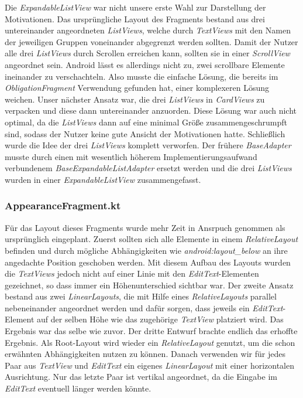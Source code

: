 Die \textit{ExpandableListView} war nicht unsere erste Wahl zur Darstellung der Motivationen. Das ursprüngliche Layout des Fragments bestand aus drei untereinander angeordneten \textit{ListViews}, welche
durch \textit{TextViews} mit den Namen der jeweiligen Gruppen voneinander abgegrenzt werden sollten. Damit der Nutzer alle drei \textit{ListViews} durch Scrollen erreichen kann, sollten sie in einer \textit{ScrollView} angeordnet sein. Android lässt es allerdings nicht zu, zwei scrollbare Elemente ineinander zu verschachteln. Also musste die einfache Lösung, die bereits im \textit{ObligationFragment} Verwendung gefunden hat, einer komplexeren Lösung weichen. Unser nächster Ansatz war, die drei \textit{ListViews} in \textit{CardViews} zu verpacken und diese dann untereinander anzuorden. Diese Lösung war auch nicht optimal, da die \textit{ListViews} dann auf eine minimal Größe zusammengeschrumpft sind, sodass der Nutzer keine gute Ansicht der Motivationen hatte. Schließlich wurde die Idee der drei \textit{ListViews} komplett verworfen. Der frühere \textit{BaseAdapter} musste durch einen mit wesentlich höherem Implementierungsaufwand verbundenem \textit{BaseExpandableListAdapter} ersetzt werden und die drei \textit{ListViews} wurden in einer \textit{ExpandableListView} zusammengefasst.

\subsubsection{AppearanceFragment.kt}
Für das Layout dieses Fragments wurde mehr Zeit in Ansrpuch genommen als ursprünglich eingeplant. Zuerst sollten sich alle Elemente in einem \textit{RelativeLayout} befinden und durch mögliche Abhängigkeiten wie \textit{android:layout\_below} an ihre angedachte Position geschoben werden. Mit diesem Aufbau des Layouts wurden die \textit{TextViews} jedoch nicht auf einer Linie mit den \textit{EditText}-Elementen gezeichnet, so dass immer ein Höhenunterschied sichtbar war. Der zweite Ansatz bestand aus zwei \textit{LinearLayouts}, die mit Hilfe eines \textit{RelativeLayouts} parallel nebeneinander angeordnet werden und dafür sorgen, dass jeweils ein \textit{EditText}-Element auf der selben Höhe wie das zugehörige \textit{TextView} platziert wird. Das Ergebnis war das selbe wie zuvor. Der dritte Entwurf brachte endlich das erhoffte Ergebnis. Als Root-Layout wird wieder ein \textit{RelativeLayout} genutzt, um die schon erwähnten Abhängigkeiten nutzen zu können. Danach verwenden wir für jedes Paar aus \textit{TextView} und \textit{EditText} ein eigenes \textit{LinearLayout} mit einer horizontalen Ausrichtung. Nur das letzte Paar ist vertikal angeordnet, da die Eingabe im \textit{EditText} eventuell länger werden könnte.\\

